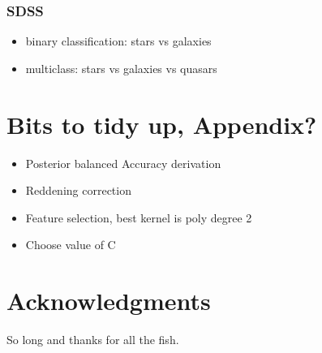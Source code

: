 \documentclass[fleqn,10pt,lineno]{wlpeerj} %
\begin{document}
\subsubsection*{SDSS}

\begin{itemize}
  \item binary classification: stars vs galaxies
  \item multiclass: stars vs galaxies vs quasars
\end{itemize}

\section*{Bits to tidy up, Appendix?}
\begin{itemize}
  \item Posterior balanced Accuracy derivation
  \item Reddening correction
  \item Feature selection, best kernel is poly degree 2
  \item Choose value of C
\end{itemize}


\section*{Acknowledgments}

So long and thanks for all the fish.


\end{document}
